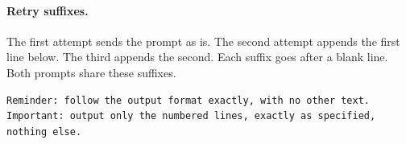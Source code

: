 \paragraph{Retry suffixes.} The first attempt sends the prompt as is. The second
attempt appends the first line below. The third appends the second. Each suffix goes
after a blank line. Both prompts share these suffixes.
\begin{lstlisting}
Reminder: follow the output format exactly, with no other text.
Important: output only the numbered lines, exactly as specified, nothing else.
\end{lstlisting}
